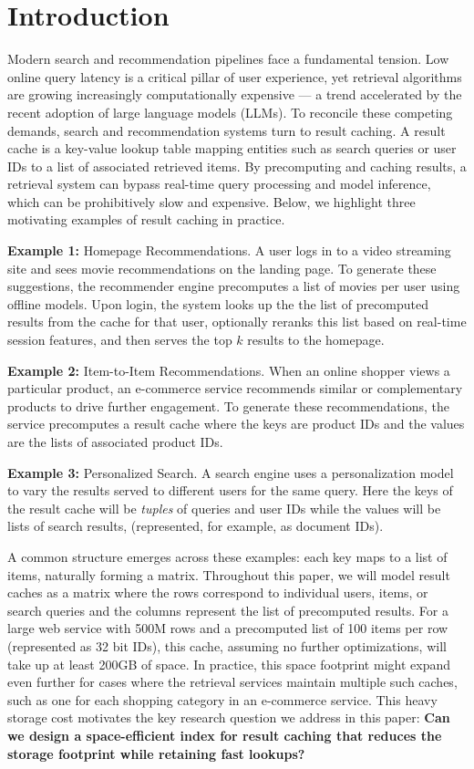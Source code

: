 \section{Introduction}

Modern search and recommendation pipelines face a fundamental tension. Low online query latency is a critical pillar of user experience, yet retrieval algorithms are growing increasingly computationally expensive — a trend accelerated by the recent adoption of large language models (LLMs). To reconcile these competing demands, search and recommendation systems turn to result caching. A result cache is a key-value lookup table mapping entities such as search queries or user IDs to a list of associated retrieved items. By precomputing and caching results, a retrieval system can bypass real-time query processing and model inference, which can be prohibitively slow and expensive. Below, we highlight three motivating examples of result caching in practice.

\noindent \textbf{Example 1:} Homepage Recommendations. A user logs in to a video streaming site and sees movie recommendations on the landing page. To generate these suggestions, the recommender engine precomputes a list of movies per user using offline models. Upon login, the system looks up the the list of precomputed results from the cache for that user, optionally reranks this list based on real-time session features, and then serves the top $k$ results to the homepage.   


\noindent \textbf{Example 2:} Item-to-Item Recommendations. When an online shopper views a particular product, an e-commerce service recommends similar or complementary products to drive further engagement. To generate these recommendations, the service precomputes a result cache where the keys are product IDs and the values are the lists of associated product IDs. 

\noindent \textbf{Example 3:} Personalized Search. A search engine uses a personalization model to vary the results served to different users for the same query. Here the keys of the result cache will be \emph{tuples} of queries and user IDs while the values will be lists of search results, (represented, for example, as document IDs).

A common structure emerges across these examples: each key maps to a list of items, naturally forming a matrix. Throughout this paper, we will model result caches as a matrix where the rows correspond to individual users, items, or search queries and the columns represent the list of precomputed results. For a large web service with 500M rows and a precomputed list of 100 items per row (represented as 32 bit IDs), this cache, assuming no further optimizations, will take up at least 200GB of space. In practice, this space footprint might expand even further for cases where the retrieval services maintain multiple such caches, such as one for each shopping category in an e-commerce service. This heavy storage cost motivates the key research question we address in this paper: \textbf{Can we design a space-efficient index for result caching that reduces the storage footprint while retaining fast lookups?} 

